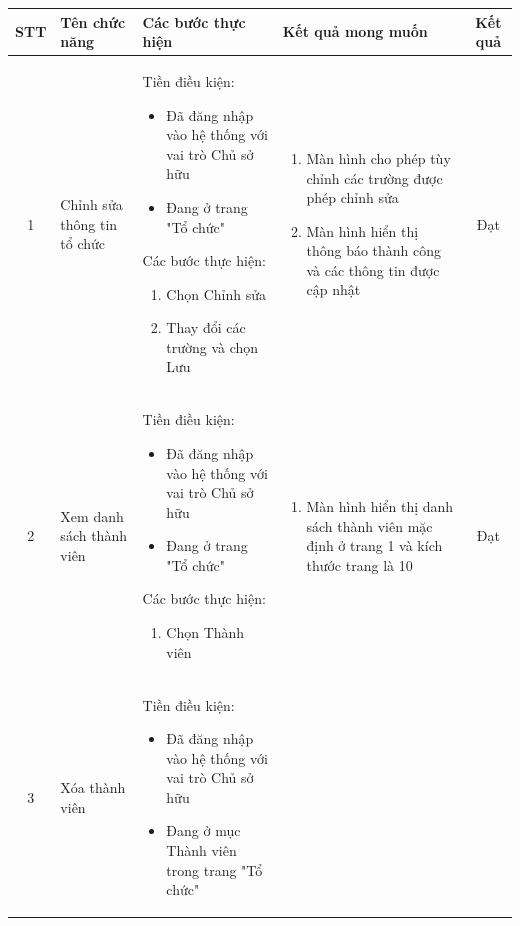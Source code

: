 \begin{longtable}{|c|m{2.5cm}|m{5.5cm}|m{4.5cm}|c|}
    \hline
    \textbf{STT} & \textbf{Tên chức năng} & \textbf{Các bước thực hiện} & \textbf{Kết quả mong muốn} & \textbf{Kết quả} \\
    \hline
    1 & 
    Chỉnh sửa thông tin tổ chức & 
    Tiền điều kiện:
    \begin{itemize}
        \item Đã đăng nhập vào hệ thống với vai trò Chủ sở hữu
        \item Đang ở trang "Tổ chức"
    \end{itemize}
    Các bước thực hiện: 
    \begin{enumerate}[label=\arabic*.]
        \item Chọn Chỉnh sửa
        \item Thay đổi các trường và chọn Lưu
    \end{enumerate}
    & 
    \begin{enumerate}[label=\arabic*.]
        \item Màn hình cho phép tùy chỉnh các trường được phép chỉnh sửa
        \item Màn hình hiển thị thông báo thành công và các thông tin được cập nhật
    \end{enumerate}  & Đạt \\
    \hline
    2 & 
    Xem danh sách thành viên & 
    Tiền điều kiện:
    \begin{itemize}
        \item Đã đăng nhập vào hệ thống với vai trò Chủ sở hữu
        \item Đang ở trang "Tổ chức"
    \end{itemize}
    Các bước thực hiện: 
    \begin{enumerate}[label=\arabic*.]
        \item Chọn Thành viên
    \end{enumerate}
    & 
    \begin{enumerate}[label=\arabic*.]
        \item Màn hình hiển thị danh sách thành viên mặc định ở trang 1 và kích thước trang là 10
    \end{enumerate}  & Đạt \\
    \hline
    3 & 
    Xóa thành viên & 
    Tiền điều kiện:
    \begin{itemize}
        \item Đã đăng nhập vào hệ thống với vai trò Chủ sở hữu
        \item Đang ở mục Thành viên trong trang "Tổ chức"

\end{itemize}
\end{longtable}
